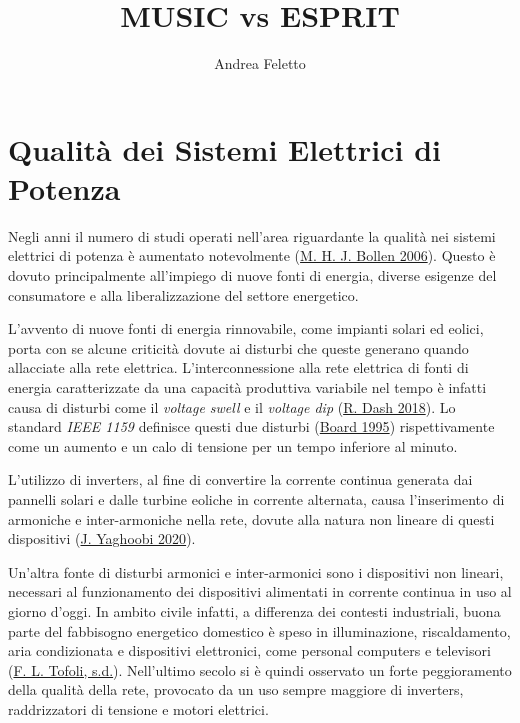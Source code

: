 \documentclass[
  italian,
]{article}
\title{MUSIC vs ESPRIT}
\author{Andrea Feletto}
\date{}
\begin{document}
\maketitle

{
\setcounter{tocdepth}{3}
\tableofcontents
}
\newpage

\hypertarget{qualituxe0-dei-sistemi-elettrici-di-potenza}{%
\section{Qualità dei Sistemi Elettrici di
Potenza}\label{qualituxe0-dei-sistemi-elettrici-di-potenza}}

Negli anni il numero di studi operati nell'area riguardante la qualità
nei sistemi elettrici di potenza è aumentato notevolmente
(\protect\hyperlink{ref-dsp-pqd}{M. H. J. Bollen 2006}). Questo è dovuto
principalmente all'impiego di nuove fonti di energia, diverse esigenze
del consumatore e alla liberalizzazione del settore energetico.

L'avvento di nuove fonti di energia rinnovabile, come impianti solari ed
eolici, porta con se alcune criticità dovute ai disturbi che queste
generano quando allacciate alla rete elettrica. L'interconnessione alla
rete elettrica di fonti di energia caratterizzate da una capacità
produttiva variabile nel tempo è infatti causa di disturbi come il
\emph{voltage swell} e il \emph{voltage dip}
(\protect\hyperlink{ref-effective-power-quality}{R. Dash 2018}). Lo
standard \emph{IEEE 1159} definisce questi due disturbi
(\protect\hyperlink{ref-ieee-1159}{Board 1995}) rispettivamente come un
aumento e un calo di tensione per un tempo inferiore al minuto.

L'utilizzo di inverters, al fine di convertire la corrente continua
generata dai pannelli solari e dalle turbine eoliche in corrente
alternata, causa l'inserimento di armoniche e inter-armoniche nella
rete, dovute alla natura non lineare di questi dispositivi
(\protect\hyperlink{ref-impact-inverters}{J. Yaghoobi 2020}).

Un'altra fonte di disturbi armonici e inter-armonici sono i dispositivi
non lineari, necessari al funzionamento dei dispositivi alimentati in
corrente continua in uso al giorno d'oggi. In ambito civile infatti, a
differenza dei contesti industriali, buona parte del fabbisogno
energetico domestico è speso in illuminazione, riscaldamento, aria
condizionata e dispositivi elettronici, come personal computers e
televisori (\protect\hyperlink{ref-losses-cables}{F. L. Tofoli, s.d.}).
Nell'ultimo secolo si è quindi osservato un forte peggioramento della
qualità della rete, provocato da un uso sempre maggiore di inverters,
raddrizzatori di tensione e motori elettrici.
\end{document}
